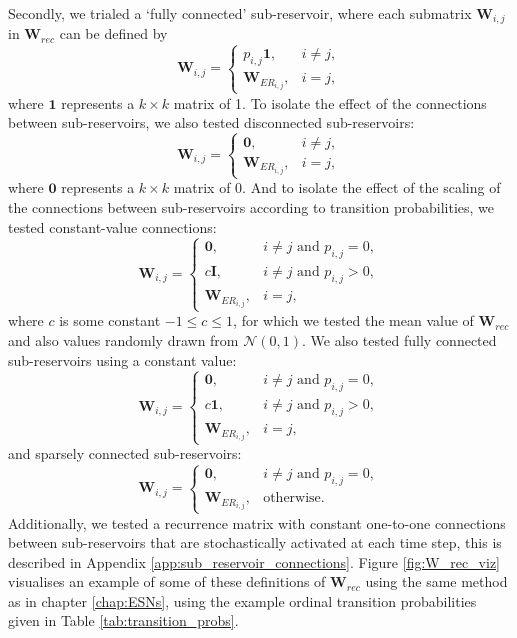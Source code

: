 Secondly, we trialed a `fully connected' sub-reservoir, where each submatrix $\mathbf{W}_{i,j}$ in $\mathbf{W}_{rec}$ can be defined by
\[
\mathbf{W}_{i,j} =
\begin{cases}
p_{i,j}\mathbf{1} , & i \neq j, \\
\mathbf{W}_{ER_{i,j}}, & i = j,
\end{cases}
\]
where $\mathbf{1}$ represents a $k\times k$ matrix of 1. To isolate the effect of the connections between sub-reservoirs, we also tested disconnected sub-reservoirs:
\[
\mathbf{W}_{i,j} =
\begin{cases}
\mathbf{0}, & i \neq j, \\
\mathbf{W}_{ER_{i,j}}, & i = j,
\end{cases}
\]
where $\mathbf{0}$ represents a $k\times k$ matrix of 0. And to isolate the effect of the scaling of the connections between sub-reservoirs according to transition probabilities, we tested constant-value connections:
\[
\mathbf{W}_{i,j} =
\begin{cases}
\mathbf{0}, & i \neq j \text{ and } p_{i,j} = 0, \\
c\mathbf{I}, & i \neq j \text{ and } p_{i,j} > 0, \\
\mathbf{W}_{ER_{i,j}}, & i = j,
\end{cases}
\]
where $c$ is some constant $-1 \leqslant c \leqslant 1$, for which we tested the mean value of $\mathbf{W}_{rec}$ and also values randomly drawn from $\mathcal{N}(0,1)$. We also tested fully connected sub-reservoirs using a constant value:
\[
\mathbf{W}_{i,j} =
\begin{cases}
\mathbf{0}, & i \neq j \text{ and } p_{i,j} = 0, \\
c\mathbf{1}, & i \neq j \text{ and } p_{i,j} > 0, \\
\mathbf{W}_{ER_{i,j}}, & i = j,
\end{cases}
\]
and sparsely connected sub-reservoirs:
\[
\mathbf{W}_{i,j} =
\begin{cases}
\mathbf{0}, & i \neq j \text{ and } p_{i,j} = 0, \\
\mathbf{W}_{ER_{i,j}}, & \text{otherwise}.
\end{cases}
\]
Additionally, we tested a recurrence matrix with constant one-to-one connections between sub-reservoirs that are stochastically activated at each time step, this is described in Appendix \ref{app:sub_reservoir_connections}. Figure \ref{fig:W_rec_viz} visualises an example of some of these definitions of $\mathbf{W}_{rec}$ using the same method as in chapter \ref{chap:ESNs}, using the example ordinal transition probabilities given in Table \ref{tab:transition_probs}.


